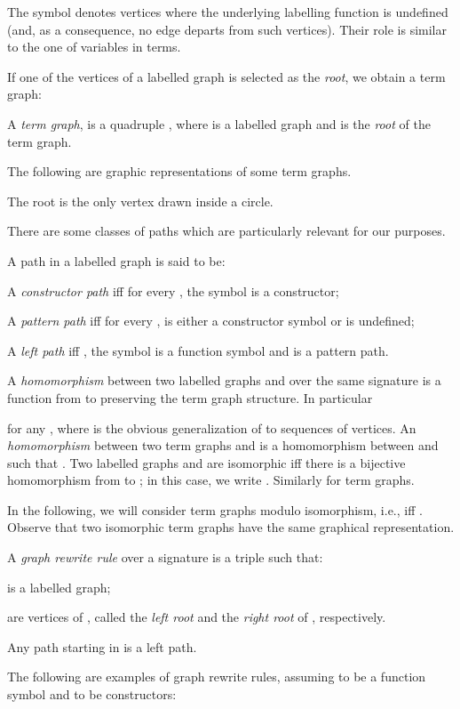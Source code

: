 \documentclass{LMCS}
\newenvironment{varitemize}
{
\begin{list}{\labelitemi}
{\setlength{\itemsep}{0.0mm}
 \setlength{\topsep}{0.0mm}
 \setlength{\parindent}{0.0mm}
 \setlength{\parskip}{0.0mm}
 \setlength{\parsep}{0.0mm}
 \setlength{\partopsep}{0.0mm}
 \setlength{\leftmargin}{15pt}
 \setlength{\labelsep}{5pt}
 \setlength{\labelwidth}{10pt}}}
{
 \end{list} 
}
\begin{document}
The symbol  denotes vertices where the underlying labelling function
is undefined (and, as a consequence, no edge departs from such vertices).
Their role is similar to the one of variables in terms.

If one of the vertices of a labelled graph is selected as the \emph{root}, we obtain
a term graph:
\begin{defi}
A \emph{term graph}, is a quadruple 
, where 
 is a labelled graph and
 is the \emph{root} of the term graph.
\end{defi}
The following are graphic representations of some term graphs.

The root is the only vertex drawn inside a circle.

There are some classes of paths which are particularly relevant for our purposes.
\begin{defi}[Path]
A path  in a labelled graph
 is said to be:
\begin{varitemize}
\item
  A \emph{constructor path} iff for every , the symbol
   is a constructor;
\item
  A \emph{pattern path} iff for every , 
   is either a constructor symbol or is undefined;
\item
  A \emph{left path} iff , the symbol  is 
  a function symbol and 
  is a pattern path.
\end{varitemize}
\end{defi}

\begin{defi}[Homomorphism]
A \emph{homomorphism} between two labelled graphs 
 and 
 over the same 
signature  is a function  from  to  
preserving the term graph structure. In particular

for any , where  is the obvious
generalization of  to sequences of vertices. 
An \emph{homomorphism} between two term graphs 
 and 
 is
a homomorphism between  and 
 such that
. Two labelled graphs  and  are 
isomorphic iff there is a bijective homomorphism from
 to ; in this case, we write . Similarly
for term graphs.
\end{defi}
In the following, we will consider term graphs modulo isomorphism, i.e., 
iff . Observe that two isomorphic term graphs have the same graphical
representation.
\begin{defi}
A \emph{graph rewrite rule} over a signature  
is a triple  such that:
\begin{varitemize}
\item
   is a labelled graph;
\item
   are vertices of , called 
  the \emph{left root} and the \emph{right root} of ,
  respectively.
\item
  Any path starting in  is a
  left path.
\end{varitemize}
\end{defi}
The following are examples of graph rewrite rules, assuming  to be a function
symbol and  to be constructors:
\end{document}
